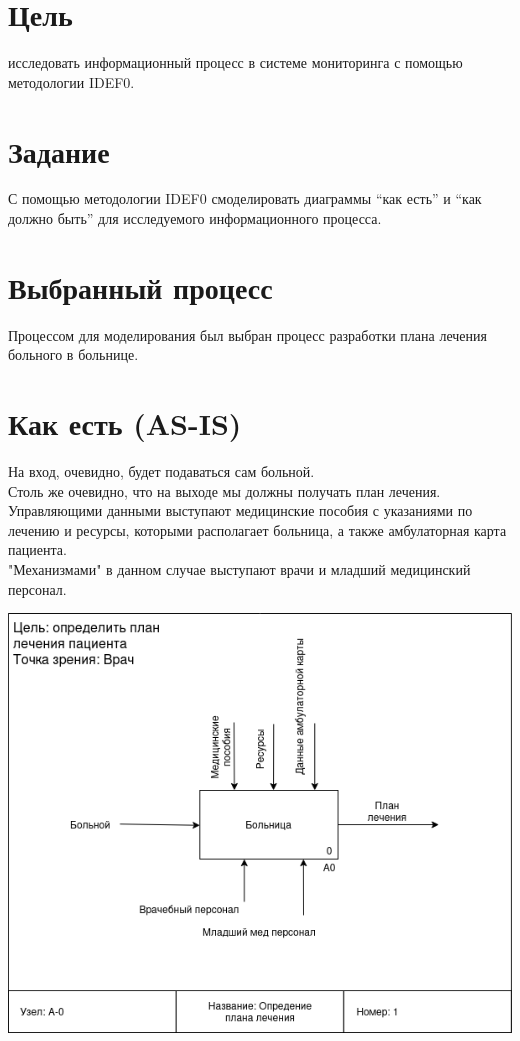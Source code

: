 \documentclass[a4paper, 12pt]{article}
\begin{document}

\pagebreak
\tableofcontents
\newpage
\section*{Цель}
исследовать информационный процесс в системе мониторинга с
помощью методологии IDEF0.
\section*{Задание}
С помощью методологии IDEF0 смоделировать диаграммы
“как есть” и “как должно быть” для исследуемого информационного процесса.
\section*{Выбранный процесс}
Процессом для моделирования был выбран процесс разработки плана лечения больного в больнице.
\newpage
\section{Как есть (AS-IS)}
На вход, очевидно, будет подаваться сам больной. \\
Столь же очевидно, что на выходе мы должны получать план лечения.\\
Управляющими данными выступают медицинские пособия с указаниями по лечению и ресурсы, которыми располагает больница, а также амбулаторная карта пациента. \\
"Механизмами" в данном случае выступают врачи и младший медицинский персонал.
\begin{center}
  \centering
  \includegraphics[width=1\linewidth]{extra/as-is_context.png}
  \label{fig:prplot}
\end{center}
\end{document}
